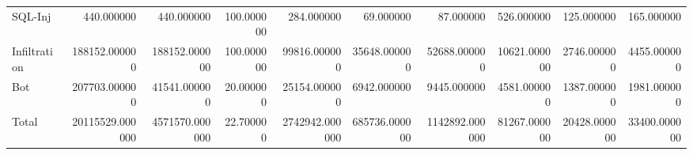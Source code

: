 \begin{table}
\begin{tabular}{lrrrrrrrrr}
SQL-Inj & 440.000000 & 440.000000 & 100.000000 & 284.000000 & 69.000000 & 87.000000 & 526.000000 & 125.000000 & 165.000000 \\
Infiltration & 188152.000000 & 188152.000000 & 100.000000 & 99816.000000 & 35648.000000 & 52688.000000 & 10621.000000 & 2746.000000 & 4455.000000 \\
Bot & 207703.000000 & 41541.000000 & 20.000000 & 25154.000000 & 6942.000000 & 9445.000000 & 4581.000000 & 1387.000000 & 1981.000000 \\
Total & 20115529.000000 & 4571570.000000 & 22.700000 & 2742942.000000 & 685736.000000 & 1142892.000000 & 81267.000000 & 20428.000000 & 33400.000000 \\
\bottomrule
\end{tabular}
\end{table}
